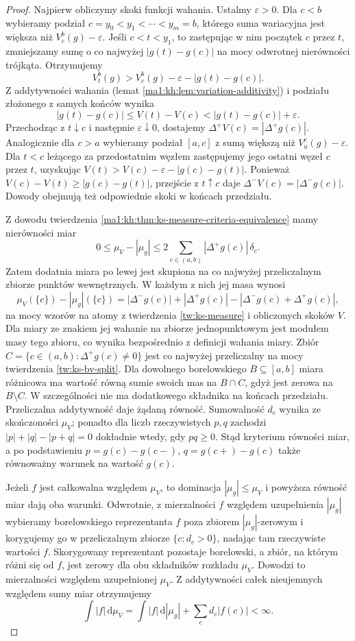 \begin{proof}
Najpierw obliczymy skoki funkcji wahania. Ustalmy $\varepsilon>0$. Dla $c<b$ wybieramy podział $c=y_0<y_1<\cdots<y_m=b$, którego suma wariacyjna jest większa niż $V_c^b(g)-\varepsilon$. Jeśli $c<t<y_1$, to zastępując w nim początek $c$ przez $t$, zmniejszamy sumę o co najwyżej $|g(t)-g(c)|$ na mocy odwrotnej nierówności trójkąta. Otrzymujemy
\[
 V_t^b(g)>V_c^b(g)-\varepsilon-|g(t)-g(c)|.
\]
Z addytywności wahania (lemat \ref{ma1:kh:lem:variation-additivity}) i podziału złożonego z samych końców wynika
\[
 |g(t)-g(c)|\le V(t)-V(c)
 < |g(t)-g(c)|+\varepsilon .
\]
Przechodząc z $t\downarrow c$ i następnie $\varepsilon\downarrow0$, dostajemy $\Delta^+V(c)=|\Delta^+g(c)|$. Analogicznie dla $c>a$ wybieramy podział $[a,c]$ z sumą większą niż $V_a^c(g)-\varepsilon$. Dla $t<c$ leżącego za przedostatnim węzłem zastępujemy jego ostatni węzeł $c$ przez $t$, uzyskując $V(t)>V(c)-\varepsilon-|g(c)-g(t)|$. Ponieważ $V(c)-V(t)\ge |g(c)-g(t)|$, przejście z $t\uparrow c$ daje $\Delta^-V(c)=|\Delta^-g(c)|$. Dowody obejmują też odpowiednie skoki w końcach przedziału.

Z dowodu twierdzenia \ref{ma1:kh:thm:ks-measure-criteria-equivalence} mamy nierówności miar
\[
 0\le\mu_V-|\mu_g|
 \le 2\sum_{c\in(a,b)}|\Delta^+g(c)|\,\delta_c .
\]
Zatem dodatnia miara po lewej jest skupiona na co najwyżej przeliczalnym zbiorze punktów wewnętrznych. W każdym z nich jej masa wynosi
\[
 \mu_V(\{c\})-|\mu_g|(\{c\})
 =|\Delta^-g(c)|+|\Delta^+g(c)|
  -|\Delta^-g(c)+\Delta^+g(c)|,
\]
na mocy wzorów na atomy z twierdzenia \ref{tw:ks-measure} i obliczonych skoków $V$. Dla miary ze znakiem jej wahanie na zbiorze jednopunktowym jest modułem masy tego zbioru, co wynika bezpośrednio z definicji wahania miary. Zbiór $C=\{c\in(a,b):\Delta^+g(c)\ne0\}$ jest co najwyżej przeliczalny na mocy twierdzenia \ref{tw:ks-bv-split}. Dla dowolnego borelowskiego $B\subseteq[a,b]$ miara różnicowa ma wartość równą sumie swoich mas na $B\cap C$, gdyż jest zerowa na $B\setminus C$. W szczególności nie ma dodatkowego składnika na końcach przedziału. Przeliczalna addytywność daje żądaną równość. Sumowalność $d_c$ wynika ze skończoności $\mu_V$; ponadto dla liczb rzeczywistych $p,q$ zachodzi $|p|+|q|-|p+q|=0$ dokładnie wtedy, gdy $pq\ge0$. Stąd kryterium równości miar, a po podstawieniu $p=g(c)-g(c-)$, $q=g(c+)-g(c)$ także równoważny warunek na wartość $g(c)$.

Jeżeli $f$ jest całkowalna względem $\mu_V$, to dominacja $|\mu_g|\le\mu_V$ i powyższa równość miar dają oba warunki. Odwrotnie, z mierzalności $f$ względem uzupełnienia $|\mu_g|$ wybieramy borelowskiego reprezentanta $f$ poza zbiorem $|\mu_g|$-zerowym i korygujemy go w przeliczalnym zbiorze $\{c:d_c>0\}$, nadając tam rzeczywiste wartości $f$. Skorygowany reprezentant pozostaje borelowski, a zbiór, na którym różni się od $f$, jest zerowy dla obu składników rozkładu $\mu_V$. Dowodzi to mierzalności względem uzupełnionej $\mu_V$. Z addytywności całek nieujemnych względem sumy miar otrzymujemy
\[
 \int |f|\,\mathrm d\mu_V
 =\int |f|\,\mathrm d|\mu_g|+\sum_c d_c|f(c)|<\infty .
\]
\end{proof}
